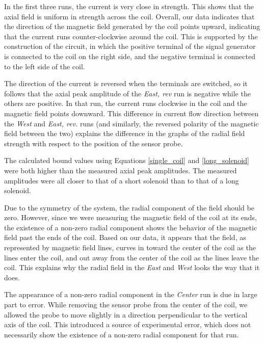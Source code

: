 In the first three runs, the current is very close in strength. This shows that the axial field is uniform in strength across the coil. Overall, our data indicates that the direction of the magnetic field generated by the coil points upward, indicating that the current runs counter-clockwise around the coil. This is supported by the construction of the circuit, in which the positive terminal of the signal generator is connected to the coil on the right side, and the negative terminal is connected to the left side of the coil.

\bigskip
The direction of the current is reversed when the terminals are switched, so it follows that the axial peak amplitude of the \textit{East, rev} run is negative while the others are positive. In that run, the current runs clockwise in the coil and the magnetic field points downward. This difference in current flow direction between the \textit{West} and \textit{East, rev.} runs (and similarly, the reversed polarity of the magnetic field between the two) explains the difference in the graphs of the radial field strength with respect to the position of the sensor probe.

\bigskip
The calculated bound values using Equations \ref{single_coil} and \ref{long_solenoid} were both higher than the measured axial peak amplitudes. The measured amplitudes were all closer to that of a short solenoid than to that of a long solenoid.

\bigskip
Due to the symmetry of the system, the radial component of the field should be zero. However, since we were measuring the magnetic field of the coil at its ends, the existence of a non-zero radial component shows the behavior of the magnetic field past the ends of the coil. Based on our data, it appears that the field, as represented by magnetic field lines, curves in toward the center of the coil as the lines enter the coil, and out away from the center of the coil as the lines leave the coil. This explains why the radial field in the \textit{East} and \textit{West} looks the way that it does.

\bigskip
The appearance of a non-zero radial component in the \textit{Center} run is due in large part to error. While removing the sensor probe from the center of the coil, we allowed the probe to move slightly in a direction perpendicular to the vertical axis of the coil. This introduced a source of experimental error, which does not necessarily show the existence of a non-zero radial component for that run.